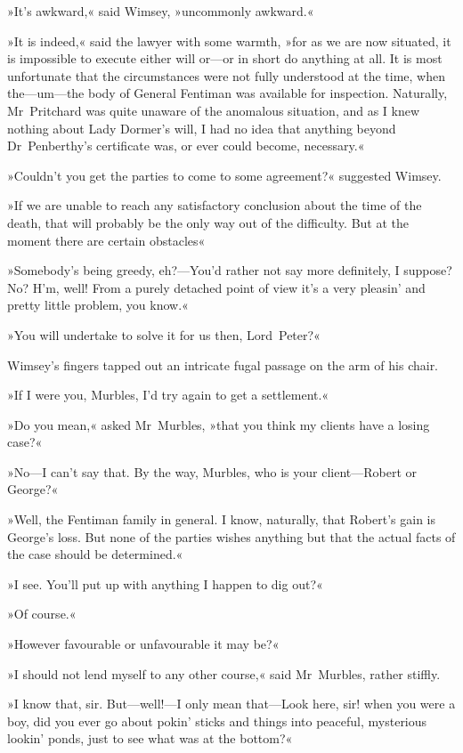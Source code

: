 »It's awkward,« said Wimsey, »uncommonly awkward.«

»It is indeed,« said the lawyer with some warmth, »for as we are now situated, it is impossible to execute either will or—or in short do anything at all. It is most unfortunate that the circumstances were not fully understood at the time, when the—um—the body of General Fentiman was available for inspection. Naturally, Mr~Pritchard was quite unaware of the anomalous situation, and as I knew nothing about Lady Dormer's will, I had no idea that anything beyond Dr~Penberthy's certificate was, or ever could become, necessary.«

»Couldn't you get the parties to come to some agreement?« suggested Wimsey.

»If we are unable to reach any satisfactory conclusion about the time of the death, that will probably be the only way out of the difficulty. But at the moment there are certain obstacles\longdash«

»Somebody's being greedy, eh?—You'd rather not say more definitely, I suppose? No? H'm, well! From a purely detached point of view it's a very pleasin' and pretty little problem, you know.«

»You will undertake to solve it for us then, Lord~Peter?«

Wimsey's fingers tapped out an intricate fugal passage on the arm of his chair.

»If I were you, Murbles, I'd try again to get a settlement.«

»Do you mean,« asked Mr~Murbles, »that you think my clients have a losing case?«

»No—I can't say that. By the way, Murbles, who is your client—Robert or George?«

»Well, the Fentiman family in general. I know, naturally, that Robert's gain is George's loss. But none of the parties wishes anything but that the actual facts of the case should be determined.«

»I see. You'll put up with anything I happen to dig out?«

»Of course.«

»However favourable or unfavourable it may be?«

»I should not lend myself to any other course,« said Mr~Murbles, rather stiffly.

»I know that, sir. But—well!—I only mean that—Look here, sir! when you were a boy, did you ever go about pokin' sticks and things into peaceful, mysterious lookin' ponds, just to see what was at the bottom?«

